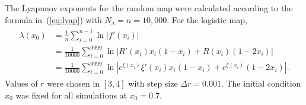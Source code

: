 The Lyapunov exponents for the random map were calculated according to
the formula in~(\ref{eq:lyap}) with $N_\lambda=n=10,000$. For the logistic map, 
\begin{align}
\begin{split}
\lambda(x_0) &= \frac{1}{n} \sum_{i=0}^{n-1} \ln |f'(x_i)|\\
&= \frac{1}{10000} \sum_{i=0}^{9999} \ln |R'(x_i)x_i(1-x_i) +R(x_i)(1-2x_i)|\\
&= \frac{1}{10000} \sum_{i=0}^{9999} \ln |e^{\xi(x_i)}\xi'(x_i)x_i(1-x_i)+e^{\xi(x_i)}(1-2x_i)|.
\end{split}
\end{align}
Values of $r$ were chosen in $[3,4]$ with step size $\Delta r =
0.001$. The initial condition $x_0$ was fixed for all
simulations at $x_0=0.7$.

